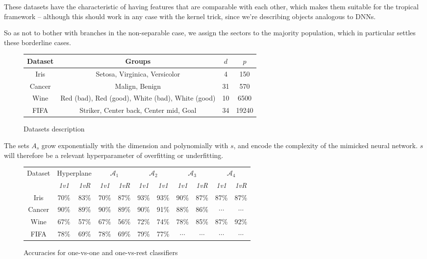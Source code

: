\documentclass[oneside,english]{amsart}
\numberwithin{equation}{section}
\numberwithin{figure}{section}
\theoremstyle{plain}
\theoremstyle{definition}
\theoremstyle{plain}
\theoremstyle{remark}
\theoremstyle{plain}
\theoremstyle{definition}
\theoremstyle{definition}
\begin{document}
These datasets have the characteristic of having features that are comparable with each other, which makes them suitable for the tropical framework -- although this should work in any case with the kernel trick, since we're describing objects analogous to DNNs.

So as not to bother with branches in the non-separable case, we assign the sectors to the majority population, which in particular settles these borderline cases.

\begin{figure}[!h]
\begin{tabular}{|c|c|c|c|}
\hline 
Dataset & Groups & $d$ & $p$\tabularnewline
\hline 
\hline 
Iris & Setosa, Virginica, Versicolor & 4 & 150\tabularnewline
\hline 
Cancer & Malign, Benign & 31 & 570\tabularnewline
\hline 
Wine & Red (bad), Red (good), White (bad), White (good) & 10 & 6500\tabularnewline
\hline 
FIFA & Striker, Center back, Center mid, Goal & 34 & 19240\tabularnewline
\hline 
\end{tabular}


\caption{Datasets description}
\end{figure}

The sets $A_s$ grow exponentially with the dimension and polynomially with $s$, and encode the complexity of the mimicked neural network. $s$ will therefore be a relevant hyperparameter of overfitting or underfitting.

\begin{figure}[!h]
\begin{tabular}{|c|c|c|c|c|c|c|c|c|c|c|}
\hline 
\multirow{2}{*}{Dataset} & \multicolumn{2}{c|}{
Hyperplane} & \multicolumn{2}{c|}{$\mathcal{A}_{1}$} & \multicolumn{2}{c|}{$\mathcal{A}_{2}$} & \multicolumn{2}{c|}{$\mathcal{A}_{3}$} & \multicolumn{2}{c|}{$\mathcal{A}_{4}$}\tabularnewline
\cline{2-11} \cline{3-11} \cline{4-11} \cline{5-11} \cline{6-11} \cline{7-11} \cline{8-11} \cline{9-11} \cline{10-11} \cline{11-11} 
 & \emph{1v1} & \emph{1vR} & \emph{1v1} & \emph{1vR} & \emph{1v1} & \emph{1v1} & \emph{1v1} & \emph{1vR} & \emph{1v1} & \emph{1vR}\tabularnewline
\hline 
Iris & 70\% & 83\% & 70\% & 87\% & 93\% & 93\% & 90\% & 87\% & 87\% & 87\%\tabularnewline
\hline 
Cancer & 90\% & 89\% & 90\% & 89\% & 90\% & 91\% & 88\% & 86\% & $\cdots$ & $\cdots$\tabularnewline
\hline 
Wine & 67\% & 57\% & 67\% & 56\% & 72\% & 74\% & 78\% & 85\% & 87\% & 92\%\tabularnewline
\hline 
FIFA & 78\% & 69\% & 78\% & 69\% & 79\% & 77\% & $\cdots$ & $\cdots$ & $\cdots$ & $\cdots$\tabularnewline
\hline 
\end{tabular}

\caption{Accuracies for one-vs-one and one-vs-rest classifiers}
\end{figure}
\end{document}
